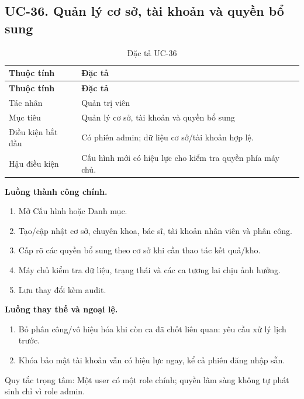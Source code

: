 \clearpage

\subsection{UC-36.\allowbreak{} Quản lý cơ sở, tài khoản và quyền bổ sung}
\label{uc:36}

{\small\setlength{\tabcolsep}{3pt}\renewcommand{\arraystretch}{1.12}
\begin{longtable}{@{}L{\textwidth-1.32pt\relax} L{\textwidth-4.68pt\relax}@{}}
\caption{Đặc tả UC-36}\\
\toprule
\textbf{Thuộc tính} & \textbf{Đặc tả}\\\midrule
\endfirsthead
\toprule
\textbf{Thuộc tính} & \textbf{Đặc tả}\\\midrule
\endhead
\bottomrule\endlastfoot
Tác nhân & Quản trị viên\\[3pt]
Mục tiêu & Quản lý cơ sở, tài khoản và quyền bổ sung\\[3pt]
Điều kiện bắt đầu & Có phiên admin; dữ liệu cơ sở/\allowbreak{}tài khoản hợp lệ.\allowbreak{}\\[3pt]
Hậu điều kiện & Cấu hình mới có hiệu lực cho kiểm tra quyền phía máy chủ.\allowbreak{}\\[3pt]
\end{longtable}}
\noindent\textbf{Luồng thành công chính.}
\begin{enumerate}
\item Mở Cấu hình hoặc Danh mục.\allowbreak{}
\item Tạo/\allowbreak{}cập nhật cơ sở, chuyên khoa, bác sĩ, tài khoản nhân viên và phân công.\allowbreak{}
\item Cấp rõ các quyền bổ sung theo cơ sở khi cần thao tác kết quả/\allowbreak{}kho.\allowbreak{}
\item Máy chủ kiểm tra dữ liệu, trạng thái và các ca tương lai chịu ảnh hưởng.\allowbreak{}
\item Lưu thay đổi kèm audit.\allowbreak{}
\end{enumerate}
\noindent\textbf{Luồng thay thế và ngoại lệ.}
\begin{enumerate}
\item Bỏ phân công/\allowbreak{}vô hiệu hóa khi còn ca đã chốt liên quan:\allowbreak{} yêu cầu xử lý lịch trước.\allowbreak{}
\item Khóa bảo mật tài khoản vẫn có hiệu lực ngay, kể cả phiên đăng nhập sẵn.\allowbreak{}
\end{enumerate}
Quy tắc trọng tâm:\allowbreak{} Một user có một role chính; quyền lâm sàng không tự phát sinh chỉ vì role admin.\allowbreak{}

